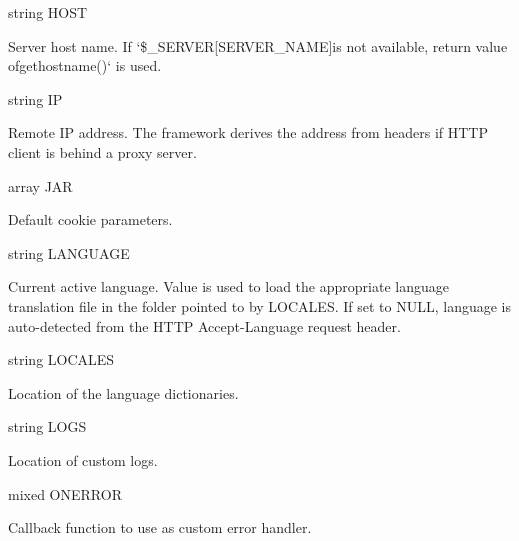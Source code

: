 {\ttfamily string H\+O\+ST}


\begin{DoxyItemize}
\item Server host name. If `\$\+\_\+\+S\+E\+R\+V\+ER\mbox{[}\textquotesingle{}S\+E\+R\+V\+E\+R\+\_\+\+N\+A\+ME\textquotesingle{}\mbox{]}{\ttfamily is not available, return value of}gethostname()` is used.
\end{DoxyItemize}

{\ttfamily string IP}


\begin{DoxyItemize}
\item Remote IP address. The framework derives the address from headers if H\+T\+TP client is behind a proxy server.
\end{DoxyItemize}

{\ttfamily array J\+AR}


\begin{DoxyItemize}
\item Default cookie parameters.
\end{DoxyItemize}

{\ttfamily string L\+A\+N\+G\+U\+A\+GE}


\begin{DoxyItemize}
\item Current active language. Value is used to load the appropriate language translation file in the folder pointed to by {\ttfamily L\+O\+C\+A\+L\+ES}. If set to {\ttfamily N\+U\+LL}, language is auto-\/detected from the H\+T\+TP {\ttfamily Accept-\/\+Language} request header.
\end{DoxyItemize}

{\ttfamily string L\+O\+C\+A\+L\+ES}


\begin{DoxyItemize}
\item Location of the language dictionaries.
\end{DoxyItemize}

{\ttfamily string L\+O\+GS}


\begin{DoxyItemize}
\item Location of custom logs.
\end{DoxyItemize}

{\ttfamily mixed O\+N\+E\+R\+R\+OR}


\begin{DoxyItemize}
\item Callback function to use as custom error handler.
\end{DoxyItemize}

